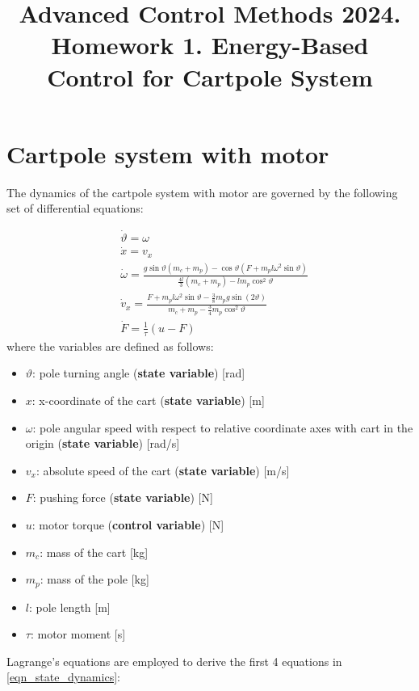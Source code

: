 \documentclass[12pt]{article}
\title{Advanced Control Methods 2024. Homework 1. Energy-Based Control for Cartpole System}
\begin{document}
\section*{Cartpole system with motor}

The dynamics of the cartpole system with motor are governed by the following set of differential equations:

\begin{equation}
    \label{eqn_state_dynamics}
    \begin{aligned}
        &\dot{\vartheta} =  \omega \\
        &\dot{x} = v_x \\
        &\dot{\omega} =  \frac{g \sin{\vartheta}(m_c + m_p) - \cos{\vartheta}(F + m_p l \omega^2 \sin{\vartheta})}{\frac{4l}{3}(m_c + m_p) - lm_p \cos^2{\vartheta}}\\
        &\dot{v}_x = \frac{F + m_p l \omega ^2 \sin{\vartheta} - \frac{3}{8}m_p g\sin(2\vartheta)}{m_c + m_p - \frac{3}{4} m_p \cos ^ 2 \vartheta} \\
        &\dot{F} = \frac{1}{\tau}(u - F)
    \end{aligned}
\end{equation}
where the variables are defined as follows:
\begin{itemize}
\item $\vartheta$: pole turning angle (\textbf{state variable}) [rad]
\item $x$: x-coordinate of the cart (\textbf{state variable}) [m]
\item $\omega$: pole angular speed with respect to relative coordinate axes with cart in the origin (\textbf{state variable}) [rad/s]
\item $v_x$: absolute speed of the cart (\textbf{state variable}) [m/s]
\item $F$: pushing force (\textbf{state variable}) [N]
\item $u$: motor torque (\textbf{control variable}) [N]
\item $m_c$: mass of the cart [kg]
\item $m_p$: mass of the pole [kg]
\item $l$: pole length [m]
\item $\tau$: motor moment [s]
\end{itemize}
Lagrange's equations are employed to derive the first 4 equations in \eqref{eqn_state_dynamics}:
\end{document}
